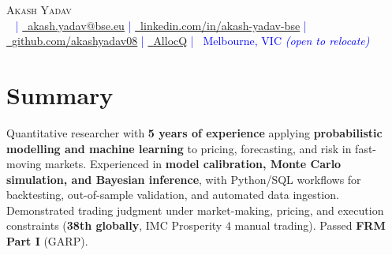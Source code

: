 

\begin{center}
{\Huge \scshape Akash Yadav} \\[3pt]
\footnotesize
\textcolor{blue}{
\raisebox{-0.1\height}\faPhone\ \underline{\href{tel:\phonenum}{\phonenum}} |
\href{mailto:yadav@bse.eu}{\raisebox{-0.2\height}\faEnvelope\  \underline{akash.yadav@bse.eu}} |
\href{https://www.linkedin.com/in/akash-yadav-bse}{\raisebox{-0.2\height}\faLinkedin\ \underline{linkedin.com/in/akash-yadav-bse}} |
\href{https://github.com/akashyadav08}
{\raisebox{-0.2\height}\faGithub\ \underline{github.com/akashyadav08}} |
\href{https://www.allocq.com/}
{\raisebox{-0.1\height}\faAllocQ\ \underline{AllocQ}} |
{\raisebox{-0.1\height}\faMapMarker\ Melbourne, VIC} \textit{(open to relocate)}
}
\end{center}

\section*{Summary}
\noindent
\small
\justifying %
Quantitative researcher with \textbf{5 years of experience} applying \textbf{probabilistic modelling and machine learning} to pricing, forecasting, and risk in fast-moving markets. Experienced in \textbf{model calibration, Monte Carlo simulation, and Bayesian inference}, with Python/SQL workflows for backtesting, out-of-sample validation, and automated data ingestion. Demonstrated trading judgment under market-making, pricing, and execution constraints (\textbf{38th globally}, IMC Prosperity 4 manual trading). Passed \textbf{FRM Part I} (GARP).

